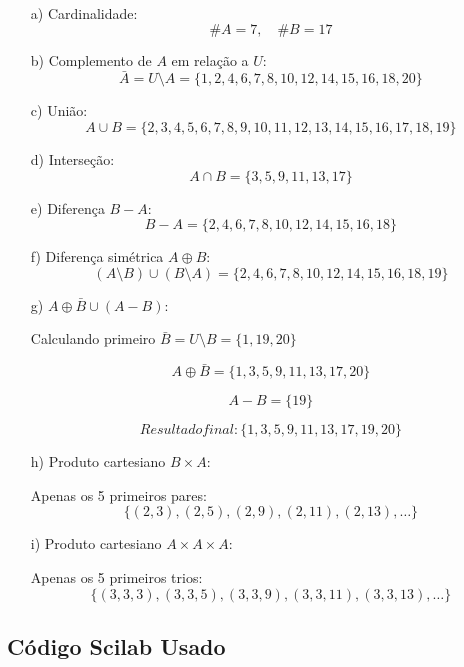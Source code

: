 \begin{enumerate}
    \item[a)] Cardinalidade:
    \[
    \#A = 7, \quad \#B = 17
    \]

    \item[b)] Complemento de \(A\) em relação a \(U\):
    \[
    \bar{A} = U \setminus A = \{1, 2, 4, 6, 7, 8, 10, 12, 14, 15, 16, 18, 20\}
    \]

    \item[c)] União:
    \[
    A \cup B = \{2, 3, 4, 5, 6, 7, 8, 9, 10, 11, 12, 13, 14, 15, 16, 17, 18, 19\}
    \]

    \item[d)] Interseção:
    \[
    A \cap B = \{3, 5, 9, 11, 13, 17\}
    \]

    \item[e)] Diferença \(B - A\):
    \[
    B - A = \{2, 4, 6, 7, 8, 10, 12, 14, 15, 16, 18\}
    \]

    \item[f)] Diferença simétrica \(A \oplus B\):
    \[
    (A \setminus B) \cup (B \setminus A) = \{2, 4, 6, 7, 8, 10, 12, 14, 15, 16, 18, 19\}
    \]

    \item[g)] \(A \oplus \bar{B} \cup (A - B)\):

    Calculando primeiro \(\bar{B} = U \setminus B = \{1, 19, 20\}\)

    \[
    A \oplus \bar{B} = \{1, 3, 5, 9, 11, 13, 17, 20\}
    \]

    \[
    A - B = \{19\}
    \]

    \[
    Resultado final: \{1, 3, 5, 9, 11, 13, 17, 19, 20\}
    \]

    \item[h)] Produto cartesiano \(B \times A\):

    Apenas os 5 primeiros pares:
    \[
    \{(2,3), (2,5), (2,9), (2,11), (2,13), \ldots\}
    \]

    \item[i)] Produto cartesiano \(A \times A \times A\):

    Apenas os 5 primeiros trios:
    \[
    \{(3,3,3), (3,3,5), (3,3,9), (3,3,11), (3,3,13), \ldots\}
    \]
\end{enumerate}

\subsection*{Código Scilab Usado}

